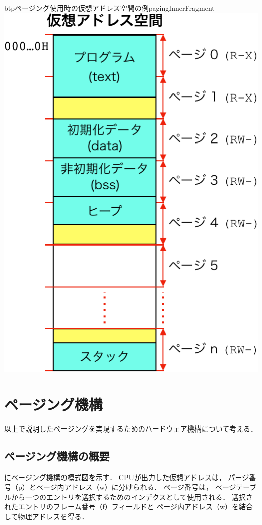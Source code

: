 \begin{myfig}{btp}{ページング使用時の仮想アドレス空間の例}{pagingInnerFragment}
  \includegraphics[scale=0.66]{Fig/pagingInnerFragment-crop.pdf}
\end{myfig}

\section{ページング機構}
以上で説明したページングを実現するためのハードウェア機構について考える．

\subsection{ページング機構の概要}
にページング機構の模式図を示す．
CPUが出力した仮想アドレスは，
パージ番号（p）とページ内アドレス（w）に分けられる．
ページ番号は，
ページテーブルから一つのエントリを選択するためのインデクスとして使用される．
選択されたエントリのフレーム番号（f）フィールドと
ページ内アドレス（w）を結合して物理アドレスを得る．

